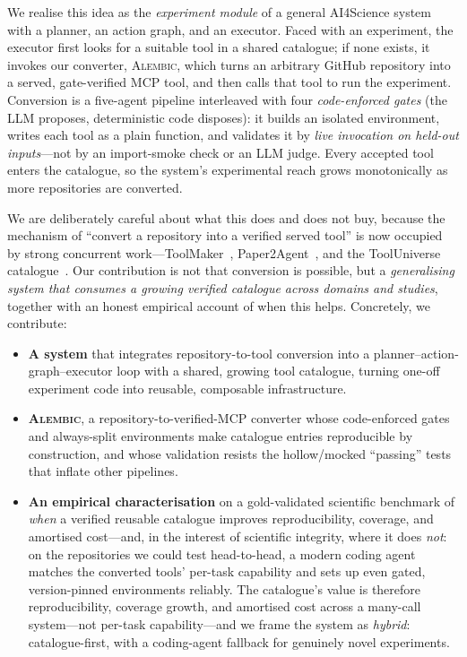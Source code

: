 We realise this idea as the \emph{experiment module} of a general AI4Science
system with a planner, an action graph, and an executor. Faced with an
experiment, the executor first looks for a suitable tool in a shared catalogue;
if none exists, it invokes our converter, \textsc{Alembic}, which turns an
arbitrary GitHub repository into a served, gate-verified MCP tool, and then calls
that tool to run the experiment. Conversion is a five-agent pipeline interleaved
with four \emph{code-enforced gates} (the LLM proposes, deterministic code disposes):
it builds an isolated environment, writes each tool as a plain function, and
validates it by \emph{live invocation on held-out inputs}---not by an
import-smoke check or an LLM judge. Every accepted tool enters the catalogue, so
the system's experimental reach grows monotonically as more repositories are
converted.

We are deliberately careful about what this does and does not buy, because the
mechanism of ``convert a repository into a verified served tool'' is now
occupied by strong concurrent work---ToolMaker~\citep{wolflein2025toolmaker_acl},
Paper2Agent~\citep{miao2025paper2agent}, and the ToolUniverse
catalogue~\citep{gao2025tooluniverse}. Our contribution is not that conversion is
possible, but a \emph{generalising system that consumes a growing verified
catalogue across domains and studies}, together with an honest empirical account
of when this helps. Concretely, we contribute:
\begin{itemize}
  \item \textbf{A system} that integrates repository-to-tool conversion into a
    planner--action-graph--executor loop with a shared, growing tool catalogue,
    turning one-off experiment code into reusable, composable infrastructure.
  \item \textbf{\textsc{Alembic}}, a repository-to-verified-MCP converter whose
    code-enforced gates and always-split environments make catalogue entries
    reproducible by construction, and whose validation resists the
    hollow/mocked ``passing'' tests that inflate other pipelines.
  \item \textbf{An empirical characterisation} on a gold-validated scientific
    benchmark of \emph{when} a verified reusable catalogue improves
    reproducibility, coverage, and amortised cost---and, in the interest of
    scientific integrity, where it does \emph{not}: on the repositories we could
    test head-to-head, a modern coding agent matches the converted tools'
    per-task capability and sets up even gated, version-pinned environments
    reliably. The catalogue's value is therefore reproducibility, coverage
    growth, and amortised cost across a many-call system---not per-task
    capability---and we frame the system as \emph{hybrid}: catalogue-first, with
    a coding-agent fallback for genuinely novel experiments.
\end{itemize}
